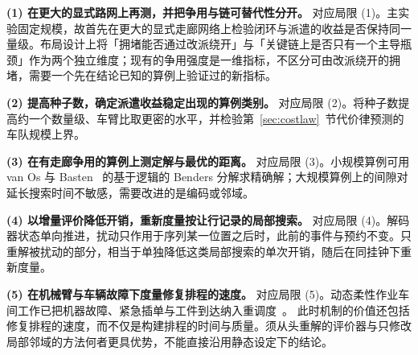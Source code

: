 \documentclass[manuscript,screen,review]{acmart}
\begin{document}
\textbf{(1) 在更大的显式路网上再测，并把争用与链可替代性分开。}
对应局限 (1)。主实验固定规模，故首先在更大的显式走廊网络上检验闭环与派遣的收益是否保持同一量级。布局设计上将「拥堵能否通过改派绕开」与「关键链上是否只有一个主导瓶颈」作为两个独立维度；现有的争用强度是一维指标，不区分可由改派绕开的拥堵，需要一个先在结论已知的算例上验证过的新指标。

\textbf{(2) 提高种子数，确定派遣收益稳定出现的算例类别。}
对应局限 (2)。将种子数提高约一个数量级、车臂比取更密的水平，并检验第~\ref{sec:costlaw}~节代价律预测的车队规模上界。

\textbf{(3) 在有走廊争用的算例上测定解与最优的距离。}
对应局限 (3)。小规模算例可用 van Os 与 Basten~\cite{vanos2026exact} 的基于逻辑的 Benders 分解求精确解；大规模算例上的间隙对延长搜索时间不敏感，需要改进的是编码或邻域。

\textbf{(4) 以增量评价降低开销，重新度量按让行记录的局部搜索。}
对应局限 (4)。解码器状态单向推进，扰动只作用于序列某一位置之后时，此前的事件与预约不变。只重解被扰动的部分，相当于单独降低这类局部搜索的单次开销，随后在同挂钟下重新度量。

\textbf{(5) 在机械臂与车辆故障下度量修复排程的速度。}
对应局限 (5)。动态柔性作业车间工作已把机器故障、紧急插单与工件到达纳入重调度~\cite{gui2023dynamic,zhao2026deep,dauzereperes2024fjsp}。
此时机制的价值还包括修复排程的速度，而不仅是构建排程的时间与质量。须从头重解的评价器与只修改局部邻域的方法何者更具优势，不能直接沿用静态设定下的结论。







\end{document}
